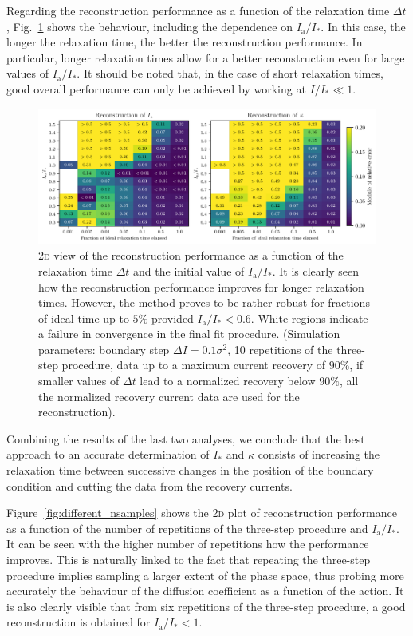 {Regarding the reconstruction performance as a function of the relaxation time $\Delta t$, Fig.~\ref{fig:different_time} shows the behaviour, including the dependence on $I_\mathrm{a}/I_\ast$. In this case, the longer the relaxation time, the better the reconstruction performance. In particular, longer relaxation times allow for a better reconstruction even for large values of $I_\mathrm{a}/I_\ast$. It should be noted that, in the case of short relaxation times, good overall performance can only be achieved by working at $I/I_\ast \ll 1$.
%
\begin{figure}[t]
    \centering
    \includegraphics[width=\textwidth]{4_probing_the_diffusive_behavior/figs/final/MULTI_different_time.pdf}
    \caption{2\textsc{d} view of the reconstruction performance as a function of the relaxation time $\Delta t$ and the initial value of $I_\mathrm{a}/I_\ast$. It is clearly seen how the reconstruction performance improves for longer relaxation times. However, the method proves to be rather robust for fractions of ideal time up to $5\%$ provided $I_\mathrm{a}/I_\ast < 0.6$. White regions indicate a failure in convergence in the final fit procedure. (Simulation parameters: boundary step $\Delta I=0.1 \sigma^2$, 10 repetitions of the three-step procedure, data up to a maximum current recovery of $90\%$, if smaller values of $\Delta t$ lead to a normalized recovery below $90\%$, all the normalized recovery current data are used for the reconstruction).}
    \label{fig:different_time}
\end{figure}
%
Combining the results of the last two analyses, we conclude that the best approach to an accurate determination of $I_\ast$ and $\kappa$ consists of increasing the relaxation time between successive changes in the position of the boundary condition and cutting the data from the recovery currents. 

Figure~\ref{fig:different_nsamples} shows the 2\textsc{d} plot of reconstruction performance as a function of the number of repetitions of the three-step procedure and $I_\mathrm{a}/I_\ast$. It can be seen with the higher number of repetitions how the performance improves. This is naturally linked to the fact that repeating the three-step procedure implies sampling a larger extent of the phase space, thus probing more accurately the behaviour of the diffusion coefficient as a function of the action. It is also clearly visible that from six repetitions of the three-step procedure, a good reconstruction is obtained for $I_\mathrm{a}/I_\ast < 1$.

}

